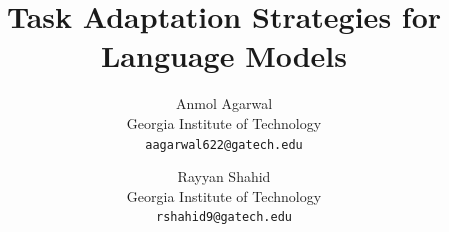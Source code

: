 \documentclass[10pt,twocolumn,letterpaper]{article}
\begin{document}
\title{Task Adaptation Strategies for Language Models}

\author{Anmol Agarwal\\
	Georgia Institute of Technology\\
	{\tt\small aagarwal622@gatech.edu}
	\and
	Rayyan Shahid\\
	Georgia Institute of Technology\\
	{\tt\small rshahid9@gatech.edu}
}

\maketitle


\end{document}
